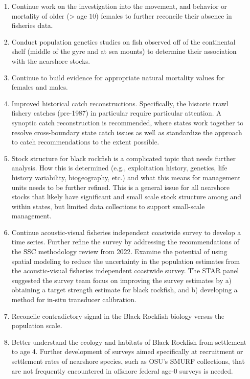 \documentclass[11pt,
  letterpaper,
]{article}
\providecommand{\tightlist}{%
  \setlength{\itemsep}{0pt}\setlength{\parskip}{0pt}}
\providecommand{\tightlist}{%
  \setlength{\itemsep}{0pt}\setlength{\parskip}{0pt}}
\begin{document}
\begin{enumerate}
\def\labelenumi{\arabic{enumi}.}
\tightlist
\item
  Continue work on the investigation into the movement, and behavior or mortality of older (\textgreater{} age 10) females to further reconcile their absence in fisheries data.
\item
  Conduct population genetics studies on fish observed off of the continental shelf (middle of the gyre and at sea mounts) to determine their association with the nearshore stocks.
\item
  Continue to build evidence for appropriate natural mortality values for females and males.
\item
  Improved historical catch reconstructions. Specifically, the historic trawl fishery catches (pre-1987) in particular require particular attention. A synoptic catch reconstruction is recommended, where states work together to resolve cross-boundary state catch issues as well as standardize the approach to catch recommendations to the extent possible.
\item
  Stock structure for black rockfish is a complicated topic that needs further analysis. How this is determined (e.g., exploitation history, genetics, life history variability, biogeography, etc.) and what this means for management units needs to be further refined. This is a general issue for all nearshore stocks that likely have significant and small scale stock structure among and within states, but limited data collections to support small-scale management.
\item
  Continue acoustic-visual fisheries independent coastwide survey to develop a time series. Further refine the survey by addressing the recommendations of the SSC methodology review from 2022. Examine the potential of using spatial modeling to reduce the uncertainty in the population estimates from the acoustic-visual fisheries independent coastwide survey. The STAR panel suggested the survey team focus on improving the survey estimates by a) obtaining a target strength estimate for black rockfish, and b) developing a method for in-situ transducer calibration.
\item
  Reconcile contradictory signal in the Black Rockfish biology versus the population scale.
\item
  Better understand the ecology and habitats of Black Rockfish from settlement to age 4. Further development of surveys aimed specifically at recruitment or settlement rates of nearshore species, such as OSU's SMURF collections, that are not frequently encountered in offshore federal age-0 surveys is needed.

\end{enumerate}
\end{document}
